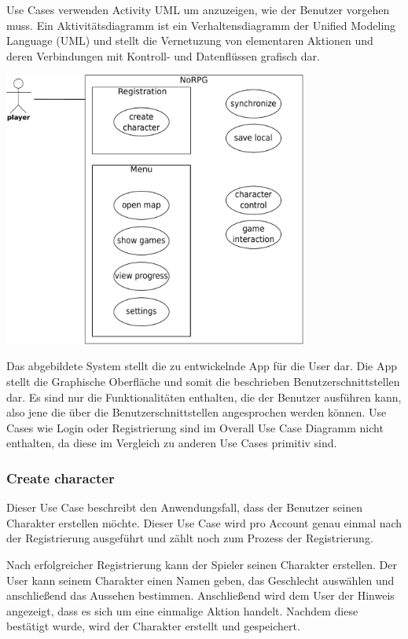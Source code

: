 		Use Cases verwenden Activity UML um anzuzeigen, wie der Benutzer vorgehen muss. Ein Aktivitätsdiagramm ist ein Verhaltensdiagramm der Unified Modeling Language (UML) und stellt die Vernetuzung von elementaren Aktionen und deren Verbindungen mit Kontroll- und Datenflüssen grafisch dar.
	
		\begin{center}
			\includegraphics[width=10cm]{pics/OUCD.pdf}
		\end{center}
		
		Das abgebildete System stellt die zu entwickelnde App für die User dar. Die App stellt die Graphische Oberfläche und somit die beschrieben Benutzerschnittstellen dar. Es sind nur die Funktionalitäten enthalten, die der Benutzer ausführen kann, also jene die über die Benutzerschnittstellen angesprochen werden können. Use Cases wie Login oder Registrierung sind im Overall Use Case Diagramm nicht enthalten, da diese im Vergleich zu anderen Use Cases primitiv sind. 
	
		\subsubsection{Create character}
			Dieser Use Case beschreibt den Anwendungsfall, dass der Benutzer seinen Charakter erstellen möchte. Dieser Use Case wird pro Account genau einmal nach der Registrierung ausgeführt und zählt noch zum Prozess der Registrierung.
			
			Nach erfolgreicher Registrierung kann der Spieler seinen Charakter erstellen. Der User kann seinem Charakter einen Namen geben, das Geschlecht auswählen und anschließend das Aussehen bestimmen. Anschließend wird dem User der Hinweis angezeigt, dass es sich um eine einmalige Aktion handelt. Nachdem diese bestätigt wurde, wird der Charakter erstellt und gespeichert.
				
